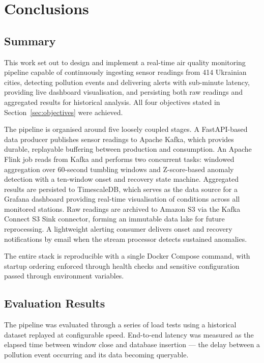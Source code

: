 \chapter{Conclusions}

\section{Summary}

This work set out to design and implement a real-time air quality monitoring pipeline capable of continuously ingesting sensor readings from 414 Ukrainian cities, detecting pollution events and delivering alerts with sub-minute latency, providing live dashboard visualisation, and persisting both raw readings and aggregated results for historical analysis. All four objectives stated in Section~\ref{sec:objectives} were achieved.

The pipeline is organised around five loosely coupled stages. A FastAPI-based data producer publishes sensor readings to Apache Kafka, which provides durable, replayable buffering between production and consumption. An Apache Flink job reads from Kafka and performs two concurrent tasks: windowed aggregation over 60-second tumbling windows and Z-score-based anomaly detection with a ten-window onset and recovery state machine. Aggregated results are persisted to TimescaleDB, which serves as the data source for a Grafana dashboard providing real-time visualisation of conditions across all monitored stations. Raw readings are archived to Amazon S3 via the Kafka Connect S3 Sink connector, forming an immutable data lake for future reprocessing. A lightweight alerting consumer delivers onset and recovery notifications by email when the stream processor detects sustained anomalies.

The entire stack is reproducible with a single Docker Compose command, with startup ordering enforced through health checks and sensitive configuration passed through environment variables.

\section{Evaluation Results}

The pipeline was evaluated through a series of load tests using a historical dataset replayed at configurable speed. End-to-end latency was measured as the elapsed time between window close and database insertion — the delay between a pollution event occurring and its data becoming queryable.

